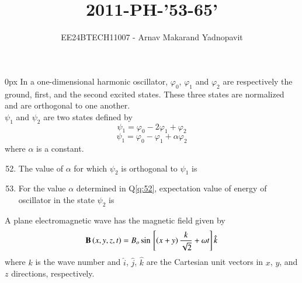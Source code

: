 \documentclass[journal,12pt,onecolumn]{IEEEtran}
\theoremstyle{remark}
\begin{document}
\title{2011-PH-'53-65'}
\author{EE24BTECH11007 - Arnav Makarand Yadnopavit}
\maketitle
\renewcommand{\thefigure}{\theenumi}
\renewcommand{\thetable}{\theenumi}
\parindent 0px In a one-dimensional harmonic oscillator, $\varphi_0$, $\varphi_1$ and $\varphi_2$ are respectively the ground, first, and the second excited states. These three states are normalized and are orthogonal to one another.\\
$\psi_1$ and $\psi_2$ are two states defined by
$$\psi_1=\varphi_0-2\varphi_1+\varphi_2$$
$$\psi_1=\varphi_0-\varphi_1+\alpha\varphi_2$$
where $\alpha$ is a constant.
\begin{enumerate}
\setcounter{enumi}{51}
\item The value of $\alpha$ for which $\psi_2$ is orthogonal to $\psi_1$ is \label{q:52}
\begin{enumerate}
\end{enumerate}
\item For the value $\alpha$ determined in Q\ref{q:52}, expectation value of energy of oscillator in the state $\psi_2$ is
\begin{enumerate}
\end{enumerate}
\end{enumerate}
A plane electromagnetic wave has the magnetic field given by
$$\mathbf{B}\left(x,y,z,t\right)=B_o\sin{}\left[\left(x+y\right)\frac{k}{\sqrt{2}}+\omega t\right]\hat{k}$$
where $k$ is the wave number and $\hat{i}$, $\hat{j}$, $\hat{k}$ are the Cartesian unit vectors in $x$, $y$, and $z$ directions, respectively.
\end{document}
